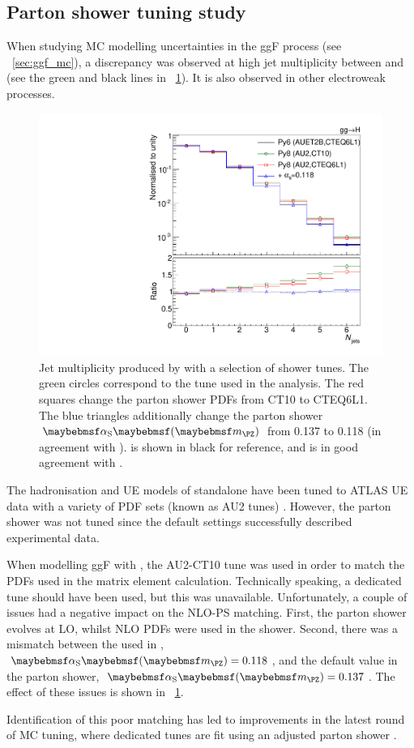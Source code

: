 \subsection{Parton shower tuning study}
\label{sec:mc:ps_tuning}

When studying MC modelling uncertainties in the ggF process (see \Section~\ref{sec:ggf_mc}), 
a discrepancy was observed at high jet multiplicity between  
and  (see the green and black lines in 
\Figure~\ref{fig:mc:ps_tuning}). It is also observed in other electroweak processes.

\begin{figure}[t]
	\includegraphics[width=\smallfigwidth]{tex/signal/matching}
	\caption{Jet multiplicity produced by  with a selection 
	of shower tunes. The green circles correspond to the tune used in the analysis. The red 
	squares change the parton shower PDFs from CT10 to CTEQ6L1. The blue triangles 
	additionally change the parton shower $\alphaS\parenths{\mZ}$ from 0.137 to 0.118 (in 
	agreement with \powhegbox).  is shown in black for 
	reference, and is in good agreement with \meps{\powhegbox}{\fherwig}.}
	\label{fig:mc:ps_tuning}
\end{figure}

The hadronisation and UE models of standalone  have been tuned to ATLAS 
UE data with a variety of PDF sets (known as AU2 tunes) \cite{ATLAS:tune:2012}.
However, the parton shower was not tuned since the default settings successfully described 
experimental data. 

When modelling ggF with \powhegbox, the AU2-CT10 tune was used in order to match the 
PDFs used in the matrix element calculation. Technically speaking, a dedicated 
 tune should have been used, but this was unavailable. 
Unfortunately, a couple of issues had a negative impact on the NLO-PS matching. First, 
the parton shower evolves \alphaS at LO, whilst NLO PDFs were used in the shower. 
Second, there was a mismatch between the \alphaS used in \powhegbox, 
$\alphaS\parenths{\mZ} = 0.118$, and the default value in the parton shower, 
$\alphaS\parenths{\mZ} = 0.137$. The effect of these issues is shown in 
\Figure~\ref{fig:mc:ps_tuning}.

Identification of this poor matching has led to improvements in the latest round of MC 
tuning, where dedicated  tunes are fit using an adjusted 
parton shower \cite{ATLAS:tune:2013}.


